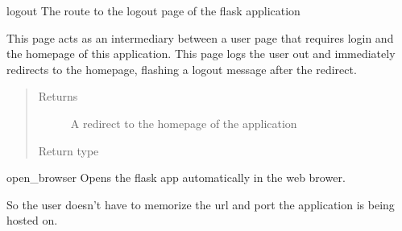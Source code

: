\documentclass[letterpaper,10pt,english]{sphinxmanual}
\begin{document}
\begin{fulllineitems}
\label{\detokenize{index:app.logout}}
logout The route to the logout page of the flask application

This page acts as an intermediary between a user page that requires login
and the homepage of this application. This page logs the user out and
immediately redirects to the homepage, flashing a logout message after
the redirect.
\begin{quote}\begin{description}
\item[{Returns}] \leavevmode
A redirect to the homepage of the application

\item[{Return type}] \leavevmode
{}

\end{description}\end{quote}

\end{fulllineitems}


\begin{fulllineitems}
\label{\detokenize{index:app.open_browser}}
open\_browser Opens the flask app automatically in the web brower.

So the user doesn’t have to memorize the url and port the application
is being hosted on.

\end{fulllineitems}


\begin{fulllineitems}
\label{\detokenize{index:app.random}}\pysiglinewithargsret{\sphinxcode{\sphinxupquote{app.}}\sphinxbfcode{\sphinxupquote{random}}}{}{{ $\rightarrow$ x in the interval {[}0, 1).}}
\end{fulllineitems}

\end{document}

